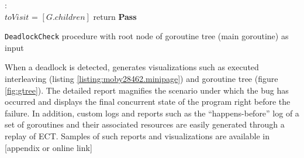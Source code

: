 \begin{small}
\begin{algorithm}[]
 \DontPrintSemicolon
 :{\\
 \Indp
    $toVisit$ = $[G.children]$\;
      return \textbf{Pass}\;
  }
 \caption{\texttt{DeadlockCheck} procedure with root node of goroutine tree (main goroutine) as input}
 \label{proc:deadlockCheck}
\end{algorithm}
\end{small}

When a deadlock is detected, \goat generates visualizations such as executed interleaving (listing \ref{listing:moby28462.minipage}) and goroutine tree (figure \ref{fig:gtree}).
%
The detailed report magnifies the scenario under which the bug has occurred and displays the final concurrent state of the program right before the failure.
%
In addition, custom logs and reports such as the ``happens-before'' log of a set of goroutines and their associated resources are easily generated through a replay of ECT.
%
Samples of such reports and visualizations are available in [appendix or online link]

